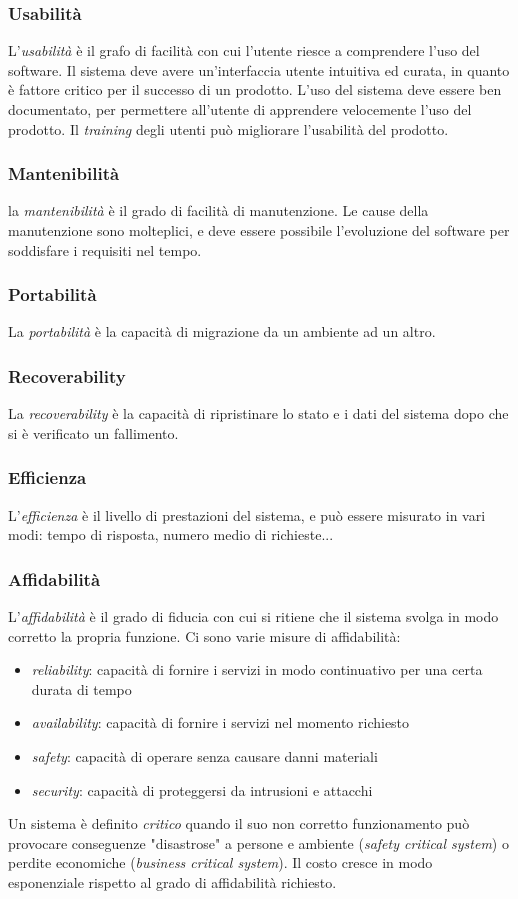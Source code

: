\documentclass[11pt]{article}
\begin{document}
\subsubsection*{Usabilità}
L'\textit{usabilità} è il grafo di facilità con cui l'utente riesce a comprendere l'uso del software. Il sistema deve avere 
un'interfaccia utente intuitiva ed curata, in quanto è fattore critico per il successo di un prodotto.
L'uso del sistema deve essere ben documentato, per permettere all'utente di apprendere velocemente l'uso del prodotto.
Il \textit{training} degli utenti può migliorare l'usabilità del prodotto.
\subsubsection*{Mantenibilità}
la \textit{mantenibilità} è il grado di facilità di manutenzione. Le cause della manutenzione sono molteplici, e deve 
essere possibile l'evoluzione del software per soddisfare i requisiti nel tempo.
\subsubsection*{Portabilità}
La \textit{portabilità} è la capacità di migrazione da un ambiente ad un altro.
\subsubsection*{Recoverability}
La \textit{recoverability} è la capacità di ripristinare lo stato e i dati del sistema dopo che si è verificato un fallimento.
\subsubsection*{Efficienza}
L'\textit{efficienza} è il livello di prestazioni del sistema, e può essere misurato in vari modi: tempo di risposta, 
numero medio di richieste... 
\subsubsection*{Affidabilità}
L'\textit{affidabilità} è il grado di fiducia con cui si ritiene che il sistema svolga in modo corretto la propria funzione.
Ci sono varie misure di affidabilità:
\begin{itemize}
    \item \textit{reliability}: capacità di fornire i servizi in modo continuativo per una certa durata di tempo 
    \item \textit{availability}: capacità di fornire i servizi nel momento richiesto
    \item \textit{safety}: capacità di operare senza causare danni materiali
    \item \textit{security}: capacità di proteggersi da intrusioni e attacchi
\end{itemize}
Un sistema è definito \textit{critico} quando il suo non corretto funzionamento può provocare conseguenze "disastrose"
a persone e ambiente (\textit{safety critical system}) o perdite economiche (\textit{business critical system}).
Il costo cresce in modo esponenziale rispetto al grado di affidabilità richiesto.
\end{document}
